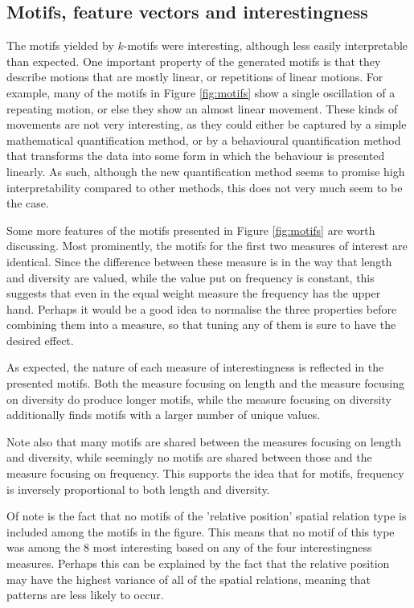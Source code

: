 \documentclass[conference,a4paper,twoside]{IEEEtran}
\begin{document}
\subsection{Motifs, feature vectors and interestingness}
The motifs yielded by $k$-motifs were interesting, although less easily interpretable than expected. One important property of the generated motifs is that they describe motions that are mostly linear, or repetitions of linear motions. For example, many of the motifs in Figure \ref{fig:motifs} show a single oscillation of a repeating motion, or else they show an almost linear movement. These kinds of movements are not very interesting, as they could either be captured by a simple mathematical quantification method, or by a behavioural quantification method that transforms the data into some form in which the behaviour is presented linearly. As such, although the new quantification method seems to promise high interpretability compared to other methods, this does not very much seem to be the case.

Some more features of the motifs presented in Figure \ref{fig:motifs} are worth discussing. Most prominently, the motifs for the first two measures of interest are identical. Since the difference between these measure is in the way that length and diversity are valued, while the value put on frequency is constant, this suggests that even in the equal weight measure the frequency has the upper hand. Perhaps it would be a good idea to normalise the three properties before combining them into a measure, so that tuning any of them is sure to have the desired effect.

As expected, the nature of each measure of interestingness is reflected in the presented motifs. Both the measure focusing on length and the measure focusing on diversity do produce longer motifs, while the measure focusing on diversity additionally finds motifs with a larger number of unique values.

Note also that many motifs are shared between the measures focusing on length and diversity, while seemingly no motifs are shared between those and the measure focusing on frequency. This supports the idea that for motifs, frequency is inversely proportional to both length and diversity.

Of note is the fact that no motifs of the 'relative position' spatial relation type is included among the motifs in the figure. This means that no motif of this type was among the 8 most interesting based on any of the four interestingness measures. Perhaps this can be explained by the fact that the relative position may have the highest variance of all of the spatial relations, meaning that patterns are less likely to occur.
\end{document}

